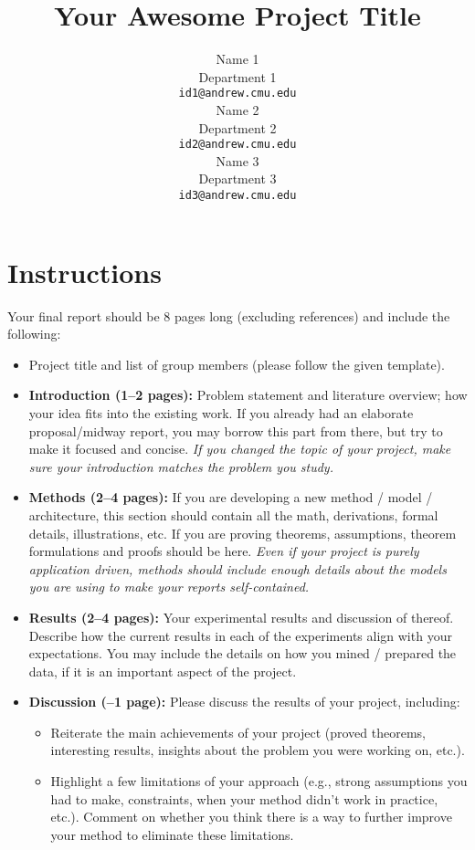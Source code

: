 \documentclass{article}
\title{Your Awesome Project Title}
\author{
  Name 1\\
  Department 1\\
  \texttt{id1@andrew.cmu.edu} \\
  \And
  Name 2 \\
  Department 2\\
  \texttt{id2@andrew.cmu.edu} \\
  \And
  Name 3\\
  Department 3\\
  \texttt{id3@andrew.cmu.edu} \\
}
\begin{document}
\maketitle


\section*{Instructions}

Your final report should be 8 pages long (excluding references) and include the following:

\begin{itemize}[leftmargin=2em]
    \item Project title and list of group members (please follow the given template).

    \item \textbf{Introduction (1--2 pages):}
    Problem statement and literature overview; how your idea fits into the existing work.
    If you already had an elaborate proposal/midway report, you may borrow this part from there, but try to make it focused and concise.
    \emph{If you changed the topic of your project, make sure your introduction matches the problem you study.}


    \item \textbf{Methods (2--4 pages):}
    If you are developing a new method / model / architecture, this section should contain all the math, derivations, formal details, illustrations, etc.
    If you are proving theorems, assumptions, theorem formulations and proofs should be here.
    \emph{Even if your project is purely application driven, methods should include enough details about the models you are using to make your reports self-contained.}

    \item \textbf{Results (2--4 pages):}
    Your experimental results and discussion of thereof.
    Describe how the current results in each of the experiments align with your expectations.
    You may include the details on how you mined / prepared the data, if it is an important aspect of the project.

    \item \textbf{Discussion (--1 page):}
    Please discuss the results of your project, including:
    \begin{itemize}
        \item Reiterate the main achievements of your project (proved theorems, interesting results, insights about the problem you were working on, etc.).
        \item Highlight a few limitations of your approach (e.g., strong assumptions you had to make, constraints, when your method didn't work in practice, etc.). Comment on whether you think there is a way to further improve your method to eliminate these limitations.
    \end{itemize}
\end{itemize}
\end{document}
